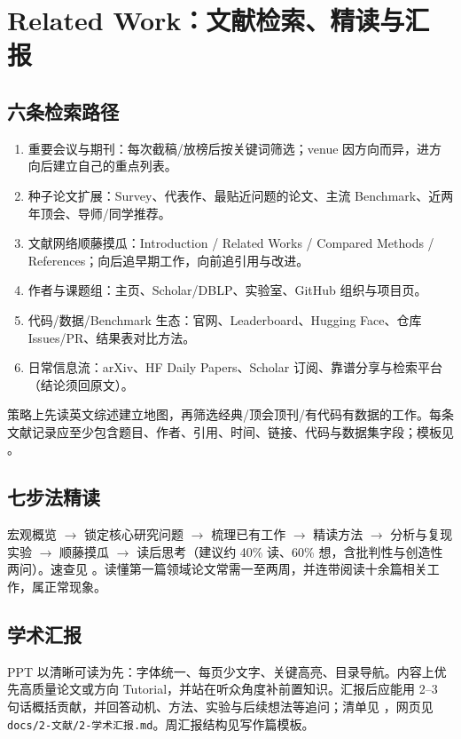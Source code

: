 ﻿\section{Related Work：文献检索、精读与汇报}
\label{sec:related}


\subsection{六条检索路径}
\begin{enumerate}
  \item 重要会议与期刊：每次截稿/放榜后按关键词筛选；venue 因方向而异，进方向后建立自己的重点列表。
  \item 种子论文扩展：Survey、代表作、最贴近问题的论文、主流 Benchmark、近两年顶会、导师/同学推荐。
  \item 文献网络顺藤摸瓜：Introduction / Related Works / Compared Methods / References；向后追早期工作，向前追引用与改进。
  \item 作者与课题组：主页、Scholar/DBLP、实验室、GitHub 组织与项目页。
  \item 代码/数据/Benchmark 生态：官网、Leaderboard、Hugging Face、仓库 Issues/PR、结果表对比方法。
  \item 日常信息流：arXiv、HF Daily Papers、Scholar 订阅、靠谱分享与检索平台（结论须回原文）。
\end{enumerate}
策略上先读英文综述建立地图，再筛选经典/顶会顶刊/有代码有数据的工作。每条文献记录应至少包含题目、作者、引用、时间、链接、代码与数据集字段；模板见 。

\subsection{七步法精读}
宏观概览 $\rightarrow$ 锁定核心研究问题 $\rightarrow$ 梳理已有工作 $\rightarrow$ 精读方法 $\rightarrow$ 分析与复现实验 $\rightarrow$ 顺藤摸瓜 $\rightarrow$ 读后思考（建议约 40\% 读、60\% 想，含批判性与创造性两问）。速查见 。读懂第一篇领域论文常需一至两周，并连带阅读十余篇相关工作，属正常现象。

\subsection{学术汇报}
PPT 以清晰可读为先：字体统一、每页少文字、关键高亮、目录导航。内容上优先高质量论文或方向 Tutorial，并站在听众角度补前置知识。汇报后应能用 2--3 句话概括贡献，并回答动机、方法、实验与后续想法等追问；清单见 ，网页见 \texttt{docs/2-文献/2-学术汇报.md}。周汇报结构见写作篇模板。
